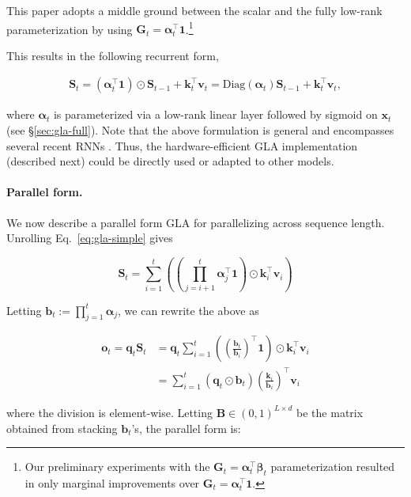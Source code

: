  This paper adopts a middle ground between the scalar and the fully low-rank parameterization by using ${\mathbf{G}}_{t} = {\bm{\alpha}}_t ^\top \mathbf{1}$.\footnote{Our preliminary experiments with the ${\mathbf{G}}_t = {\bm{\alpha}}_t^\top {\bm{\beta}}_t$ parameterization resulted in only marginal improvements over ${\mathbf{G}}_{t} = {\bm{\alpha}}_t ^\top \mathbf{1}$.}

This results in the following recurrent form,

\begin{align}
{\mathbf{S}}_t =  ({\bm{\alpha}}_t^{\top} \mathbf{1}) \odot {\mathbf{S}}_{t-1} + {\bm{k}}_t^{\top} {\bm{v}}_t = \text{Diag}({\bm{\alpha}}_t)  {\mathbf{S}}_{t-1} + {\bm{k}}_t^{\top} {\bm{v}}_t, 
\label{eq:gla-simple}
\end{align}

where ${\bm{\alpha}}_t$ is parameterized via a low-rank linear layer followed by sigmoid on ${\bm{x}}_t$ (see \S\ref{sec:gla-full}). Note that the above formulation is general and  encompasses several recent RNNs \cite{gatedloop, qin2024hgrn2, peng2024eagle}. Thus, the hardware-efficient GLA implementation (described next) could be directly used or adapted to other models. 

\paragraph{Parallel form.} We now describe a parallel form GLA for parallelizing across sequence length. Unrolling Eq.~\ref{eq:gla-simple} gives

\begin{equation*}
{\mathbf{S}}_t = \sum_{i=1}^{t} \left(\left(\prod_{j=i+1}^{t}{\bm{\alpha}}_{j}^{\top}\mathbf{1}\right) \odot {\bm{k}}_i^{\top} {\bm{v}}_i \right)    
\label{eq:gla_parallel}
\end{equation*}

Letting ${\bm{b}}_t := \prod_{j=1}^{t} {\bm{\alpha}}_j$, we can rewrite the above as

\begin{align*}
{\bm{o}}_t = {\bm{q}}_t {\mathbf{S}}_t &= {\bm{q}}_t \sum_{i=1}^{t} \left( \left(\frac{{\bm{b}}_t}{{\bm{b}}_i} \right)^{\top} \mathbf{1} \right) \odot {\bm{k}}_i^{\top} {\bm{v}}_i \\ &= \sum_{i=1}^{t}({\bm{q}}_t \odot {\bm{b}}_t) \left(\frac{{\bm{k}}_i}{{\bm{b}}_i}\right)^{\top} {\bm{v}}_i
\end{align*}

where the division is element-wise. Letting ${\mathbf{B}} \in (0,1)^{L \times d}$ be the matrix obtained from stacking ${\bm{b}}_t$'s,  the parallel form is:

